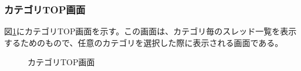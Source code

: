\documentclass[a4j]{jarticle}
\begin{document}
\subsubsection{カテゴリTOP画面}
図\ref{fig:category_top}にカテゴリTOP画面を示す。この画面は、カテゴリ毎のスレッド一覧を表示するためのもので、任意のカテゴリを選択した際に表示される画面である。
\begin{figure}[H]
\centering
{}
\caption{カテゴリTOP画面}
\label{fig:category_top}
\end{figure}
\end{document}
